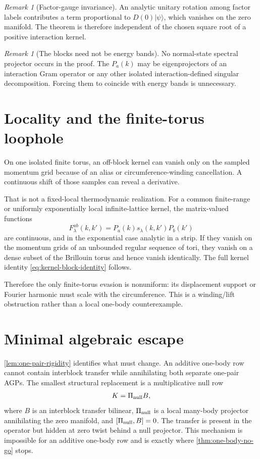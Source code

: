 \documentclass[11pt]{article}
\theoremstyle{remark}
\newtheorem{remark}[theorem]{Remark}
\begin{document}
\begin{remark}[Factor-gauge invariance]
An analytic unitary rotation among factor labels contributes a term proportional to
$D(0)|\psi\rangle$, which vanishes on the zero manifold.  The theorem is therefore
independent of the chosen square root of a positive interaction kernel.
\end{remark}

\begin{remark}[The blocks need not be energy bands]
No normal-state spectral projector occurs in the proof.  The $P_a(k)$ may be
eigenprojectors of an interaction Gram operator or any other isolated
interaction-defined singular decomposition.  Forcing them to coincide with
energy bands is unnecessary.
\end{remark}

\section{Locality and the finite-torus loophole}

On one isolated finite torus, an off-block kernel can vanish only on the
sampled momentum grid because of an alias or circumference-winding
cancellation.  A continuous shift of those samples can reveal a derivative.

That is not a fixed-local thermodynamic realization.  For a common finite-range
or uniformly exponentially local infinite-lattice kernel, the matrix-valued
functions
\begin{equation}
 F_\lambda^{ab}(k,k')
 =P_a(k)s_\lambda(k,k')P_b(k')
\end{equation}
are continuous, and in the exponential case analytic in a strip.  If they
vanish on the momentum grids of an unbounded regular sequence of tori, they
vanish on a dense subset of the Brillouin torus and hence vanish identically.
The full kernel identity \eqref{eq:kernel-block-identity} follows.

Therefore the only finite-torus evasion is nonuniform: its displacement
support or Fourier harmonic must scale with the circumference.  This is a
winding/lift obstruction rather than a local one-body counterexample.

\section{Minimal algebraic escape}

\cref{lem:one-pair-rigidity} identifies what must change.  An additive
one-body row cannot contain interblock transfer while annihilating both
separate one-pair AGPs.  The smallest structural replacement is a
multiplicative null row
\begin{equation}
 K=\Pi_{\rm null}B,
 \label{eq:multiplicative-row}
\end{equation}
where $B$ is an interblock transfer bilinear, $\Pi_{\rm null}$ is a local
many-body projector annihilating the zero manifold, and
$[\Pi_{\rm null},B]=0$.  The transfer is present in the operator but hidden at
zero twist behind a null projector.  This mechanism is impossible for an
additive one-body row and is exactly where \cref{thm:one-body-no-go} stops.
\end{document}

